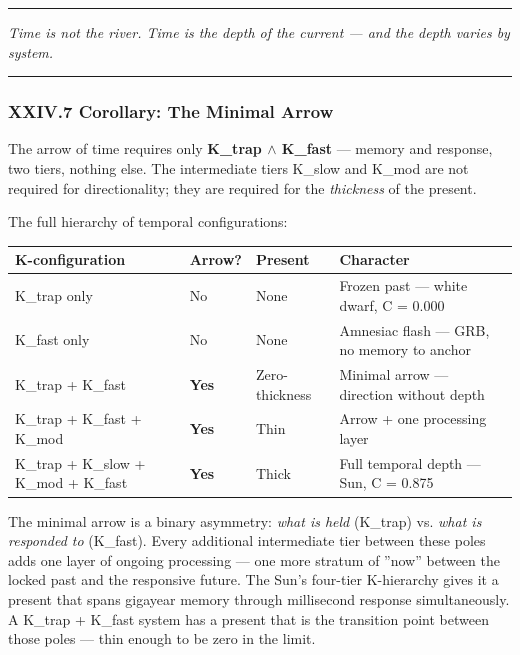 \documentclass[12pt,a4paper]{article}
\begin{document}
\begin{center}
\rule{0.5\textwidth}{0.4pt}
\end{center}

\emph{Time is not the river. Time is the depth of the current --- and the depth varies by system.}

\begin{center}
\rule{0.5\textwidth}{0.4pt}
\end{center}

\subsubsection{XXIV.7 Corollary: The Minimal Arrow}

The arrow of time requires only \textbf{K\_trap $\land$ K\_fast} --- memory and response, two tiers, nothing else. The intermediate tiers K\_slow and K\_mod are not required for directionality; they are required for the \emph{thickness} of the present.

The full hierarchy of temporal configurations:

\begin{table}[htbp]
\centering
\small
{}
\begin{tabularx}{\textwidth}{>{\centering\arraybackslash}X >{\centering\arraybackslash}X >{\centering\arraybackslash}X >{\centering\arraybackslash}X}
\toprule
\rowcolor{gray!25}\textbf{K-configuration} & \textbf{Arrow?} & \textbf{Present} & \textbf{Character} \\
\midrule
\rowcolors{1}{white}{gray!10}
K\_trap only & No & None & Frozen past --- white dwarf, C = 0.000 \\
K\_fast only & No & None & Amnesiac flash --- GRB, no memory to anchor \\
K\_trap + K\_fast & \textbf{Yes} & Zero-thickness & Minimal arrow --- direction without depth \\
K\_trap + K\_fast + K\_mod & \textbf{Yes} & Thin & Arrow + one processing layer \\
K\_trap + K\_slow + K\_mod + K\_fast & \textbf{Yes} & Thick & Full temporal depth --- Sun, C = 0.875 \\
\bottomrule
\end{tabularx}
\end{table}

The minimal arrow is a binary asymmetry: \emph{what is held} (K\_trap) vs. \emph{what is responded to} (K\_fast). Every additional intermediate tier between these poles adds one layer of ongoing processing --- one more stratum of ''now'' between the locked past and the responsive future. The Sun's four-tier K-hierarchy gives it a present that spans gigayear memory through millisecond response simultaneously. A K\_trap + K\_fast system has a present that is the transition point between those poles --- thin enough to be zero in the limit.
\end{document}

